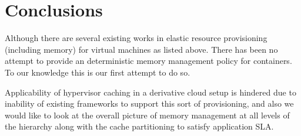   \section{Conclusions}
    Although there are several existing works in elastic resource provisioning (including memory) for virtual machines as listed above. There 
    has been no attempt to provide an deterministic memory management policy for containers. To our knowledge this is our first attempt to do 
    so.
    
    Applicability of hypervisor caching in a derivative cloud setup is hindered due to inability of existing frameworks to support this sort of
    provisioning, and also we would like to look at the overall picture of memory management at all levels of the hierarchy along with the cache
    partitioning to satisfy application SLA. 

%     
%     
%       
%    